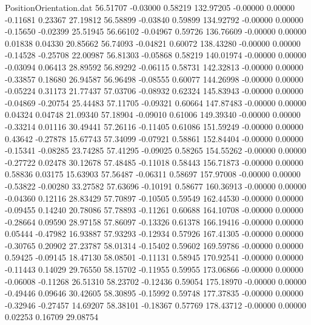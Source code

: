 \begin{filecontents}{PositionOrientation.dat}
  56.51707   -0.03000    0.58219   132.97205   -0.00000    0.00000   -0.11681    0.23367   27.19812
  56.58899   -0.03840    0.59899   134.92792   -0.00000    0.00000   -0.15650   -0.02399   25.51945
  56.66102   -0.04967    0.59726   136.76609   -0.00000    0.00000    0.01838    0.04330   20.85662
  56.74093   -0.04821    0.60072   138.43280   -0.00000    0.00000   -0.14528   -0.25708   22.00987
  56.81303   -0.05868    0.58219   140.01974   -0.00000    0.00000   -0.03094    0.06413   28.89592
  56.89292   -0.06115    0.58731   142.32813   -0.00000    0.00000   -0.33857    0.18680   26.94587
  56.96498   -0.08555    0.60077   144.26998   -0.00000    0.00000   -0.05224    0.31173   21.77437
  57.03706   -0.08932    0.62324   145.83943   -0.00000    0.00000   -0.04869   -0.20754   25.44483
  57.11705   -0.09321    0.60664   147.87483   -0.00000    0.00000    0.04324    0.04748   21.09340
  57.18904   -0.09010    0.61006   149.39340   -0.00000    0.00000   -0.33214    0.01116   30.49441
  57.26116   -0.11405    0.61086   151.59249   -0.00000    0.00000    0.43642   -0.27878   15.67743
  57.34099   -0.07921    0.58861   152.84404   -0.00000    0.00000   -0.15341   -0.08285   23.74285
  57.41295   -0.09025    0.58265   154.55262   -0.00000    0.00000   -0.27722    0.02478   30.12678
  57.48485   -0.11018    0.58443   156.71873   -0.00000    0.00000    0.58836    0.03175   15.63903
  57.56487   -0.06311    0.58697   157.97008   -0.00000    0.00000   -0.53822   -0.00280   33.27582
  57.63696   -0.10191    0.58677   160.36913   -0.00000    0.00000   -0.04360    0.12116   28.83429
  57.70897   -0.10505    0.59549   162.44530   -0.00000    0.00000   -0.09455    0.14240   20.78086
  57.78893   -0.11261    0.60688   164.10708   -0.00000    0.00000   -0.28664    0.09590   28.97158
  57.86097   -0.13326    0.61378   166.19416   -0.00000    0.00000    0.05444   -0.47982   16.93887
  57.93293   -0.12934    0.57926   167.41305   -0.00000    0.00000   -0.30765    0.20902   27.23787
  58.01314   -0.15402    0.59602   169.59786   -0.00000    0.00000    0.59425   -0.09145   18.47130
  58.08501   -0.11131    0.58945   170.92541   -0.00000    0.00000   -0.11443    0.14029   29.76550
  58.15702   -0.11955    0.59955   173.06866   -0.00000    0.00000   -0.06008   -0.11268   26.51310
  58.23702   -0.12436    0.59054   175.18970   -0.00000    0.00000   -0.49446    0.09646   30.42605
  58.30895   -0.15992    0.59748   177.37835   -0.00000    0.00000   -0.32946   -0.27457   14.69207
  58.38101   -0.18367    0.57769   178.43712   -0.00000    0.00000    0.02253    0.16709   29.08754

\end{filecontents}
